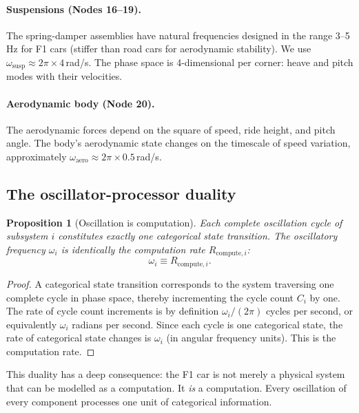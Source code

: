 \documentclass[twocolumn,10pt,a4paper]{article}
\newtheorem{proposition}[theorem]{Proposition}
\theoremstyle{definition}
\theoremstyle{remark}
\begin{document}
\paragraph{Suspensions (Nodes 16--19).} The spring-damper assemblies have natural frequencies designed in the range 3--5\,Hz for F1 cars (stiffer than road cars for aerodynamic stability). We use $\omega_{\mathrm{susp}} \approx 2\pi \times 4$\,rad/s. The phase space is 4-dimensional per corner: heave and pitch modes with their velocities.

\paragraph{Aerodynamic body (Node 20).} The aerodynamic forces depend on the square of speed, ride height, and pitch angle. The body's aerodynamic state changes on the timescale of speed variation, approximately $\omega_{\mathrm{aero}} \approx 2\pi \times 0.5$\,rad/s.

\subsection{The oscillator-processor duality}

\begin{proposition}[Oscillation is computation]\label{prop:osc_compute}
Each complete oscillation cycle of subsystem $i$ constitutes exactly one categorical state transition. The oscillatory frequency $\omega_i$ is identically the computation rate $R_{\mathrm{compute},i}$:
\begin{equation}\label{eq:osc_compute}
    \omega_i \equiv R_{\mathrm{compute},i}.
\end{equation}
\end{proposition}

\begin{proof}
A categorical state transition corresponds to the system traversing one complete cycle in phase space, thereby incrementing the cycle count $C_i$ by one. The rate of cycle count increments is by definition $\omega_i / (2\pi)$ cycles per second, or equivalently $\omega_i$ radians per second. Since each cycle is one categorical state, the rate of categorical state changes is $\omega_i$ (in angular frequency units). This is the computation rate.
\end{proof}

This duality has a deep consequence: the F1 car is not merely a physical system that can be modelled as a computation. It \emph{is} a computation. Every oscillation of every component processes one unit of categorical information.
\end{document}
